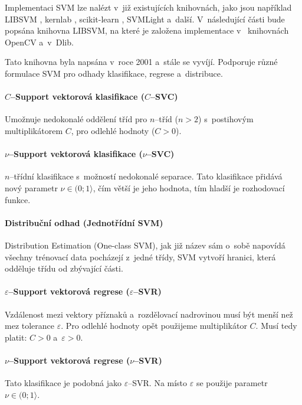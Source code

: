 Implementaci SVM lze nalézt v~již existujících knihovnách, jako jsou například LIBSVM \cite{libsvm}, kernlab \cite{kernlab}, scikit-learn \cite{scikit-learn}, SVMLight \cite{svmlight} a~další. V~následující části bude popsána knihovna LIBSVM, na které je založena implementace v~ knihovnách OpenCV a~v~Dlib.  

Tato knihovna byla napsána v~roce 2001 \cite{libsvm} a~stále se vyvíjí. Podporuje různé formulace SVM pro odhady klasifikace, regrese a~distribuce.

\paragraph*{$C$--Support vektorová klasifikace ($C$--SVC)} 
Umožnuje nedokonalé oddělení tříd pro $n$--tříd ($n > 2$) s~postihovým multiplikátorem $C$, pro odlehlé hodnoty ($C > 0$). \cite{csvmclass}

\paragraph*{$\nu$--Support vektorová klasifikace ($\nu$--SVC)} 
$n$--třídní klasifikace s~možností nedokonalé separace. Tato klasifikace přidává nový parametr $\nu \in (0;1\rangle$, čím větší je jeho hodnota, tím hladší je rozhodovací funkce. \cite{nusvmsvrclass}

\paragraph*{Distribuční odhad (Jednotřídní SVM)} 
Distribution Estimation (One-class SVM), jak již název sám o~sobě napovídá všechny trénovací data pocházejí z~jedné třídy, SVM vytvoří hranici, která odděluje třídu od zbývající části. \cite{oneclasssvm}

\paragraph*{$\varepsilon$--Support vektorová regrese ($\varepsilon$--SVR)} 
Vzdálenost mezi vektory příznaků a~rozdělovací nadrovinou musí být menší než mez tolerance $\varepsilon$. Pro odlehlé hodnoty opět použijeme multiplikátor $C$. Musí tedy platit: $C > 0$ a~$\varepsilon > 0$. \cite{svrsvm}

\paragraph*{$\nu$--Support vektorová regrese ($\nu$--SVR)} 
Tato klasifikace je podobná jako $\varepsilon$--SVR. Na místo $\varepsilon$ se použije parametr $\nu \in (0;1\rangle$. \cite{nusvmsvrclass}

